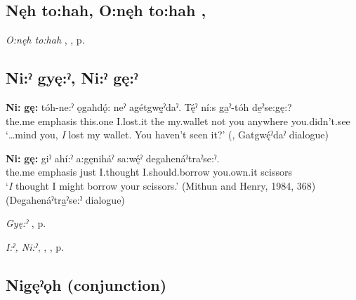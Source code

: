 \subsection*{\textbf{Nęh to:hah, O:nęh to:hah} , } \label{p:[nęh to:hah, o:nęh to:hah]}

\begin{CayugaRelated}
\item \textit{O:nęh to:hah} , , p. \pageref{p:o:nęh to:hah]}
\end{CayugaRelated}

\subsection*{\textbf{Ni:ˀ gyę:ˀ, Ni:ˀ gę:ˀ} } \label{p:[ni:ˀ gyę:ˀ]}

\ea
\label{ex:npar126}
\gll \textbf{Ni:} \textbf{gę:} tóh-ne:ˀ ǫgahdǫ́: neˀ agétgwę̱ˀdaˀ. Tę́ˀ ní:s ga̱ˀ-tóh de̱ˀse:gę:? \\
the.me emphasis this.one I.lost.it the my.wallet not you anywhere you.didn’t.see\\
\glt ‘…mind you, \emph{I} lost my wallet. You haven’t seen it?’ (\cite[184]{mithun_watewayestanih_1984}, Gatgwę́ˀdaˀ dialogue)
\z

\ea
\label{ex:npar127}
\gll \textbf{Ni:} \textbf{gę:} giˀ ahí:ˀ a:gęniháˀ sa:wę́ˀ degahenáˀtraˀse:ˀ. \\
the.me emphasis just I.thought I.should.borrow you.own.it scissors\\
\glt ‘\emph{I} thought I might borrow your scissors.’ (Mithun and Henry, 1984, 368) (Degahenáˀtra̱ˀse:ˀ dialogue)
\z

\begin{CayugaRelated}
\item \textit{Gyę:ˀ} , p. \pageref{p:[gyę:ˀ]}\\
\item \textit{I:ˀ, Ni:ˀ}, , , p. \pageref{p:[i:ˀ]}
\end{CayugaRelated}

\subsection*{\textbf{Nigęˀǫh} (conjunction)} \label{p:[…nigęˀǫh]}

